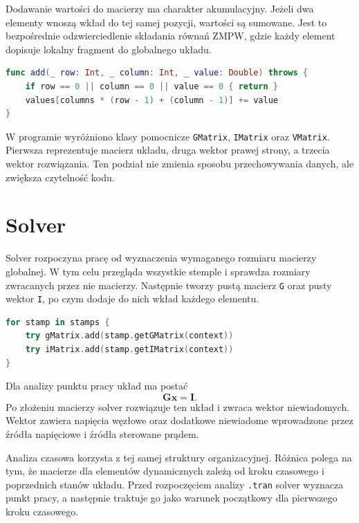 Dodawanie wartości do macierzy ma charakter akumulacyjny. Jeżeli dwa elementy wnoszą wkład do tej samej pozycji, wartości są sumowane. Jest to bezpośrednie odzwierciedlenie składania równań ZMPW, gdzie każdy element dopisuje lokalny fragment do globalnego układu.

\begin{lstlisting}[language=Swift,caption={Zasada dodawania wartości do macierzy},label={lst:matrix-add}]
func add(_ row: Int, _ column: Int, _ value: Double) throws {
    if row == 0 || column == 0 || value == 0 { return }
    values[columns * (row - 1) + (column - 1)] += value
}
\end{lstlisting}

W programie wyróżniono klasy pomocnicze \texttt{GMatrix}, \texttt{IMatrix} oraz \texttt{VMatrix}. Pierwsza reprezentuje macierz układu, druga wektor prawej strony, a trzecia wektor rozwiązania. Ten podział nie zmienia sposobu przechowywania danych, ale zwiększa czytelność kodu.

\section{Solver}
\label{sec:implementacja-solver}

Solver rozpoczyna pracę od wyznaczenia wymaganego rozmiaru macierzy globalnej. W tym celu przegląda wszystkie stemple i sprawdza rozmiary zwracanych przez nie macierzy. Następnie tworzy pustą macierz \texttt{G} oraz pusty wektor \texttt{I}, po czym dodaje do nich wkład każdego elementu.

\begin{lstlisting}[language=Swift,caption={Schemat składania macierzy globalnej},label={lst:solver-assembly}]
for stamp in stamps {
    try gMatrix.add(stamp.getGMatrix(context))
    try iMatrix.add(stamp.getIMatrix(context))
}
\end{lstlisting}

Dla analizy punktu pracy układ ma postać
\begin{equation}
  \mathbf{G}\mathbf{x} = \mathbf{I}.
\end{equation}
Po złożeniu macierzy solver rozwiązuje ten układ i zwraca wektor niewiadomych. Wektor zawiera napięcia węzłowe oraz dodatkowe niewiadome wprowadzone przez źródła napięciowe i źródła sterowane prądem.

Analiza czasowa korzysta z tej samej struktury organizacyjnej. Różnica polega na tym, że macierze dla elementów dynamicznych zależą od kroku czasowego i poprzednich stanów układu. Przed rozpoczęciem analizy \texttt{.tran} solver wyznacza punkt pracy, a następnie traktuje go jako warunek początkowy dla pierwszego kroku czasowego.

